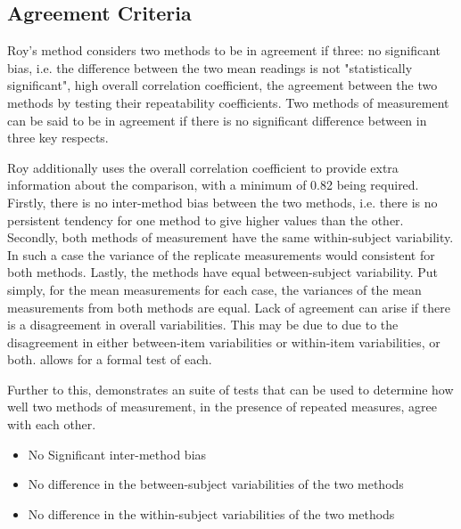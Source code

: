 \documentclass[12pt, a4paper]{report}
\theoremstyle{plain}
\theoremstyle{definition}
\theoremstyle{remark}
\begin{document}
	\subsection{Agreement Criteria}	
Roy's method considers two methods to be in agreement if three: no significant bias, i.e. the difference between the two mean readings is not "statistically significant", high overall correlation coefficient, the agreement between the two methods by testing their
repeatability coefficients. Two methods of measurement can be said to be in agreement if there is no significant difference between in three key respects. 
	
	Roy additionally uses the overall correlation coefficient to provide extra information about the comparison, with a minimum of 0.82 being required. Firstly, there is no inter-method bias between the two methods, i.e. there is no persistent tendency for one method to give higher values than the other. Secondly, both methods of measurement have the same  within-subject variability. In such a case the variance of the replicate measurements would consistent for both methods. Lastly, the methods have equal between-subject variability.  Put simply, for the mean measurements for each case, the variances of the mean measurements from both methods are equal. Lack of agreement can arise if there is a disagreement in overall variabilities. This may be due to due to the disagreement in either between-item variabilities or within-item variabilities, or both. \citet{ARoy2009} allows for a formal test of each.
	

	
	
	
	Further to this, \citet{ARoy2009} demonstrates an suite of tests that can be used to determine how well two methods of measurement, in the presence of repeated measures, agree with each other.
	
	\begin{itemize}\itemsep0.5cm
		\item No Significant inter-method bias
		\item No difference in the between-subject variabilities of the two methods
		\item No difference in the within-subject variabilities of the two methods
	\end{itemize}
	
\end{document}
